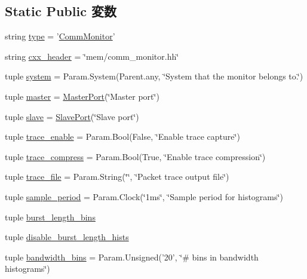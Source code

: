 \subsection*{Static Public 変数}
\begin{DoxyCompactItemize}
\item 
string \hyperlink{classCommMonitor_1_1CommMonitor_acce15679d830831b0bbe8ebc2a60b2ca}{type} = '\hyperlink{classCommMonitor_1_1CommMonitor}{CommMonitor}'
\item 
string \hyperlink{classCommMonitor_1_1CommMonitor_a17da7064bc5c518791f0c891eff05fda}{cxx\_\-header} = \char`\"{}mem/comm\_\-monitor.hh\char`\"{}
\item 
tuple \hyperlink{classCommMonitor_1_1CommMonitor_ab737471139f5a296e5b26e8a0e1b0744}{system} = Param.System(Parent.any, \char`\"{}System that the monitor belongs to.\char`\"{})
\item 
tuple \hyperlink{classCommMonitor_1_1CommMonitor_a0f74d64e6817f0f89bafc52ff3c56cbb}{master} = \hyperlink{classMasterPort}{MasterPort}(\char`\"{}Master port\char`\"{})
\item 
tuple \hyperlink{classCommMonitor_1_1CommMonitor_a9b8cb1f697e86858437a78f041478c9b}{slave} = \hyperlink{classSlavePort}{SlavePort}(\char`\"{}Slave port\char`\"{})
\item 
tuple \hyperlink{classCommMonitor_1_1CommMonitor_af3f3a502736f254f40a526b6f9e4ecff}{trace\_\-enable} = Param.Bool(False, \char`\"{}Enable trace capture\char`\"{})
\item 
tuple \hyperlink{classCommMonitor_1_1CommMonitor_a4e22e4bcba92e8cd852e6de3f5a5c296}{trace\_\-compress} = Param.Bool(True, \char`\"{}Enable trace compression\char`\"{})
\item 
tuple \hyperlink{classCommMonitor_1_1CommMonitor_acfb2147cdc6b5e4cea488bdb551672c1}{trace\_\-file} = Param.String(\char`\"{}\char`\"{}, \char`\"{}Packet trace output file\char`\"{})
\item 
tuple \hyperlink{classCommMonitor_1_1CommMonitor_a9b4d8317f49b4e999d971254f1eeebf6}{sample\_\-period} = Param.Clock(\char`\"{}1ms\char`\"{}, \char`\"{}Sample period for histograms\char`\"{})
\item 
tuple \hyperlink{classCommMonitor_1_1CommMonitor_a80b4005661e93508b76910cc0b0c2818}{burst\_\-length\_\-bins}
\item 
tuple \hyperlink{classCommMonitor_1_1CommMonitor_a0638fa9f0bf0ccb7c7dd54641dc71c7b}{disable\_\-burst\_\-length\_\-hists}
\item 
tuple \hyperlink{classCommMonitor_1_1CommMonitor_a1aef95b53308059d6defb00de70dd937}{bandwidth\_\-bins} = Param.Unsigned('20', \char`\"{}\# bins in bandwidth histograms\char`\"{})

\end{DoxyCompactItemize}
